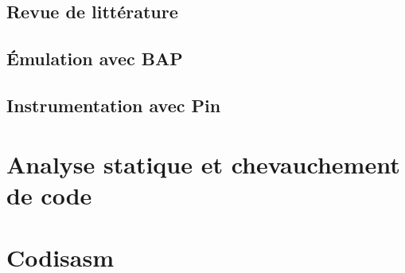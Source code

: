 \subsection{Revue de littérature}
\subsection{Émulation avec BAP}
\subsection{Instrumentation avec Pin}
\section{Analyse statique et chevauchement de code}
\section{Codisasm}